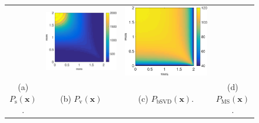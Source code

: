 \documentclass[final,5p,times,twocolumn]{elsarticle}
\begin{document}
\begin{figure}[]
\begin{tabular}{c c c c}
		& \includegraphics[width=\fwd]{figs/E110_CBFOnDifferentResolutions_plot-bSVD-scaleto-none-raw.eps}
		& \includegraphics[width=\fwd]{figs/E110_CBFOnDifferentResolutions_plot-MS-scaleto-none-raw.eps}\\
		(a) $P_{\mathrm{s}}(\mathbf{x})$. & (b) $P_{\mathrm{v}}(\mathbf{x})$ & (c) $P_{\mathrm{bSVD}}(\mathbf{x})$. & (d) $P_{\mathrm{MS}}(\mathbf{x})$.
	\end{tabular}
	\caption*{} 
        \label{fig:perfusionmapsFIG}
\end{figure}	
\clearpage
\end{document}

